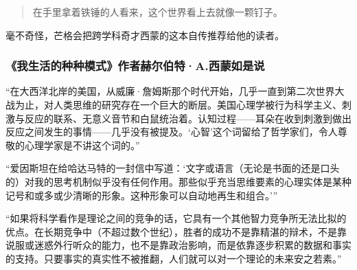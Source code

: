 \begin{quotation}
在手里拿着铁锤的人看来，这个世界看上去就像一颗钉子。
\par
\end{quotation}

毫不奇怪，芒格会把跨学科奇才西蒙的这本自传推荐给他的读者。
\par

\subsubsection*{《我生活的种种模式》作者赫尔伯特·A.西蒙如是说}

“在大西洋北岸的美国，从威廉·詹姆斯那个时代开始，几乎一直到第二次世界大战为止，对人类思维的研究存在一个巨大的断层。美国心理学被行为科学主义、刺激与反应的联系、无意义音节和白鼠统治着。认知过程——耳朵在收到刺激到做出反应之间发生的事情——几乎没有被提及。‘心智’这个词留给了哲学家们，令人尊敬的心理学家是不讲这个词的。”
\par

“爱因斯坦在给哈达马特的一封信中写道：‘文字或语言（无论是书面的还是口头的）对我的思考机制似乎没有任何作用。那些似乎充当思维要素的心理实体是某种记号和或多或少清晰的形象。这种形象可以自动地再生和组合。’”
\par

“如果将科学看作是理论之间的竞争的话，它具有一个其他智力竞争所无法比拟的优点。在长期竞争中（不超过数个世纪），胜者的成功不是靠精湛的辩术，不是靠说服或迷惑外行听众的能力，也不是靠政治影响，而是依靠逐步积累的数据和事实的支持。只要事实的真实性不被推翻，人们就可以对一个理论的未来安之若素。”
\par

